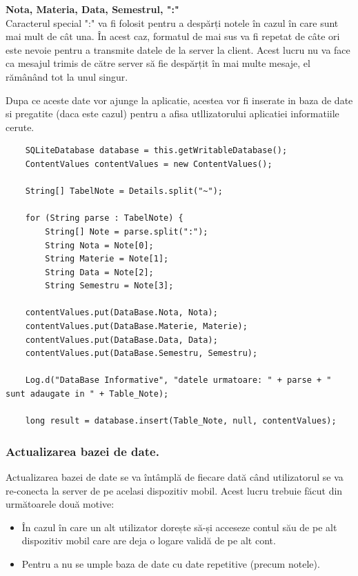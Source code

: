 \documentclass{article}
\begin{document}
	\textbf{Nota, Materia, Data, Semestrul, ":"} \\

	Caracterul special ":" va fi folosit pentru a despărți notele în cazul în care sunt mai mult de cât una. În acest caz, formatul de mai sus va fi repetat de câte ori este nevoie pentru a transmite datele de la server la client. Acest lucru nu va face ca mesajul trimis de către server să fie despărțit în mai multe mesaje, el rămânând tot la unul singur.

	Dupa ce aceste date vor ajunge la aplicatie, acestea vor fi inserate in baza de date si pregatite (daca este cazul) pentru a afisa utllizatorului aplicatiei informatiile cerute.

	\begin{verbatim}
    SQLiteDatabase database = this.getWritableDatabase();
    ContentValues contentValues = new ContentValues();

    String[] TabelNote = Details.split("~");

    for (String parse : TabelNote) {
        String[] Note = parse.split(":");
        String Nota = Note[0];
        String Materie = Note[1];
        String Data = Note[2];
        String Semestru = Note[3];

    contentValues.put(DataBase.Nota, Nota);
    contentValues.put(DataBase.Materie, Materie);
    contentValues.put(DataBase.Data, Data);
    contentValues.put(DataBase.Semestru, Semestru);

    Log.d("DataBase Informative", "datele urmatoare: " + parse + " sunt adaugate in " + Table_Note);

    long result = database.insert(Table_Note, null, contentValues);

	\end{verbatim}
		\subsubsection*{Actualizarea bazei de date.}

	 Actualizarea bazei de date se va întâmplă de fiecare dată când utilizatorul se va re-conecta la server de pe acelasi dispozitiv mobil. Acest lucru trebuie făcut din următoarele două motive:
	\begin{itemize}
		\item În cazul în care un alt utilizator dorește să-și acceseze contul său de pe alt dispozitiv mobil care are deja o logare validă de pe alt cont.
		\item Pentru a nu se umple baza de date cu date repetitive (precum notele).
	\end{itemize}
\end{document}
